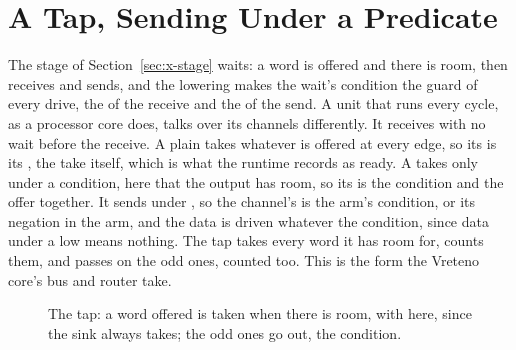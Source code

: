 \section{A Tap, Sending Under a Predicate}
\label{sec:x-tap}

The stage of Section~\ref{sec:x-stage} waits:  a word
is offered and there is room, then receives and sends, and the
lowering makes the wait's condition the guard of every drive, the
 of the receive and the  of the send. A unit
that runs every cycle, as a processor core does, talks over its
channels differently. It receives with no wait before the receive.
A plain  takes whatever is offered at every edge, so its
 is its , the take itself, which is what
the runtime records as ready. A  takes only under a
condition, here that the output has room, so its  is
the condition and the offer together. It sends under ,
so the channel's  is the arm's condition, or its
negation in the  arm, and the data is driven whatever
the condition, since data under a low  means nothing.
The tap takes every word it has room for, counts them, and passes
on the odd ones, counted too. This is the form the Vreteno core's
bus and router take.

\begin{figure}[htbp]
\centering

\caption{The tap: a word offered is taken when there is room,
 with  here, since the sink
always takes; the odd ones go out,  the
condition.}
\label{fig:x-tap}
\end{figure}




